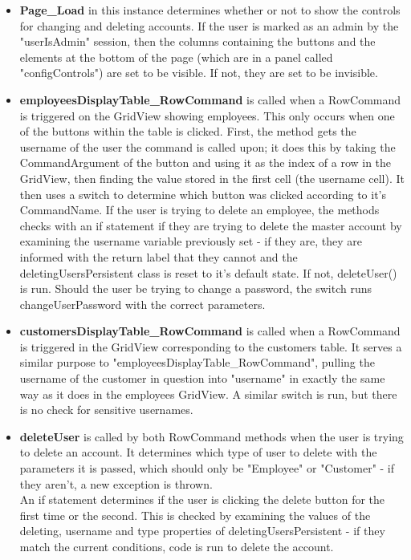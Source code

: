 ﻿\documentclass{article}
\begin{document}
    \begin{itemize}
        \item \textbf{Page\_Load} in this instance determines whether or not to show the controls for changing and deleting accounts.
        If the user is marked as an admin by the "userIsAdmin" session, then the columns containing the buttons and the elements at the bottom of the page (which are in a panel called "configControls") are set to be visible.
        If not, they are set to be invisible.
        \item \textbf{employeesDisplayTable\_RowCommand} is called when a RowCommand is triggered on the GridView showing employees.
        This only occurs when one of the buttons within the table is clicked.
        First, the method gets the username of the user the command is called upon; it does this by taking the CommandArgument of the button and using it as the index of a row in the GridView, then finding the value stored in the first cell (the username cell).
        It then uses a switch to determine which button was clicked according to it's CommandName.
        If the user is trying to delete an employee, the methods checks with an if statement if they are trying to delete the master account by examining the username variable previously set - if they are, they are informed with the return label that they cannot and the deletingUsersPersistent class is reset to it's default state.
        If not, deleteUser() is run.
        Should the user be trying to change a password, the switch runs changeUserPassword with the correct parameters.
        \item \textbf{customersDisplayTable\_RowCommand} is called when a RowCommand is triggered in the GridView corresponding to the customers table.
        It serves a similar purpose to "employeesDisplayTable\_RowCommand", pulling the username of the customer in question into "username" in exactly the same way as it does in the employees GridView.
        A similar switch is run, but there is no check for sensitive usernames.
        \item \textbf{deleteUser} is called by both RowCommand methods when the user is trying to delete an account.
        It determines which type of user to delete with the parameters it is passed, which should only be "Employee" or "Customer" - if they aren't, a new exception is thrown.
        \\
        An if statement determines if the user is clicking the delete button for the first time or the second.
        This is checked by examining the values of the deleting, username and type properties of deletingUsersPersistent - if they match the current conditions, code is run to delete the account.

\end{itemize}
\end{document}
